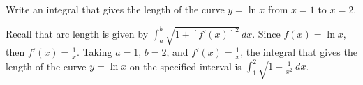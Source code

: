 \begin{Exercise} Write an integral that gives the length of the curve $ y = \ln{x}$ from $x = 1$ to $x = 2$. 
\end{Exercise}

\begin{Answer}[ref=length3]
Recall that arc length is given by $\int_a^b \sqrt{1 + [f'(x)]^2}\,dx$. Since $f(x) = \ln{x}$, then $f'(x) = \frac{1}{x}$. Taking $a = 1$, $b = 2$, and $f'(x) = \frac{1}{x}$, the integral that gives the length of the curve $y = \ln{x}$ on the specified interval is $\int_1^2 \sqrt{1+\frac{1}{x^2}}\,dx$. 
\end{Answer}